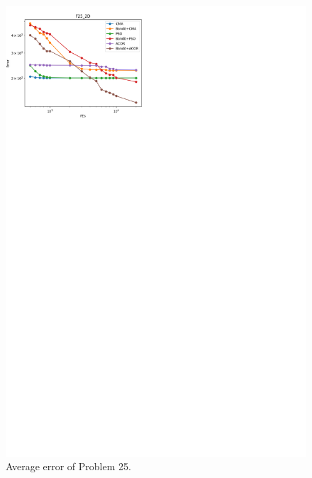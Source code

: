 \begin{figure}
\centering
\includegraphics[width=\textwidth]{Average_F25}
\caption{Average error of Problem 25.}\label{fig:Average_F25}
\end{figure}


